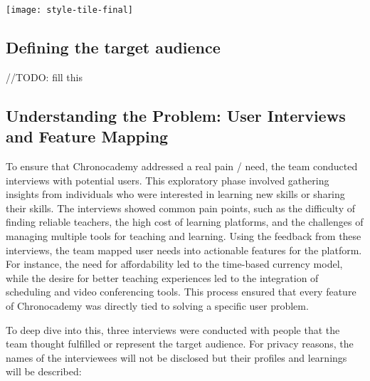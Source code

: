 \texttt{[image: style-tile-final]}\newline

\subsection{Defining the target audience}\label{subsec:target-audience}
//TODO: fill this

\subsection{Understanding the Problem: User Interviews and Feature Mapping}\label{subsec:user-interviews-feature-mapping}
To ensure that Chronocademy addressed a real pain / need, the team conducted interviews with potential users.
This exploratory phase involved gathering insights from individuals who were interested in learning new skills or sharing their skills.
The interviews showed common pain points, such as the difficulty of finding reliable teachers, the high cost of learning platforms, and the challenges of managing multiple tools for teaching and learning.
Using the feedback from these interviews, the team mapped user needs into actionable features for the platform.
For instance, the need for affordability led to the time-based currency model, while the desire for better teaching experiences led to the integration of scheduling and video conferencing tools.
This process ensured that every feature of Chronocademy was directly tied to solving a specific user problem.

To deep dive into this, three interviews were conducted with people that the team thought fulfilled or represent the target audience.
For privacy reasons, the names of the interviewees will not be disclosed but their profiles and learnings will be described:

